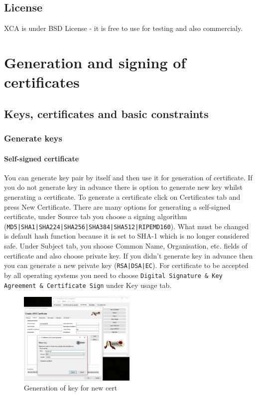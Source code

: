 \documentclass[10pt, a4paper]{report}
\begin{document}
  \subsection{License}
XCA is under BSD License - it is free to use for testing and also commercialy.
  
\section{Generation and signing of certificates}

  \subsection{Keys, certificates and basic constraints}
  
    \subsubsection{Generate keys}
    
      \paragraph{Self-signed certificate}
You can generate key pair by itself and then use it for generation of certificate. If you do not generate key in advance there is option to generate new key whilst generating a certificate. To generate a certificate click on Certificates tab and press New Certificate. There are many options for generating a self-signed certificate, under Source tab you choose a signing algorithm (\verb+MD5|SHA1|SHA224|SHA256|SHA384|SHA512|RIPEMD160+). What must be changed is default hash function because it is set to SHA-1 which is no longer considered safe. Under Subject tab, you shoose Common Name, Organisation, etc. fields of certificate and also choose private key. If you didn't generate key in advance then you can generate a new private key (\verb+RSA|DSA|EC+). For certificate to be accepted by all operating systems you need to choose \verb+Digital Signature & Key Agreement & Certificate Sign+ under Key usage tab.
\begin{figure}[!ht]
 \caption{Generation of key for new cert}
 \centering
  \includegraphics[width=0.5\textwidth]{../Dependancies/XCA/genKey.jpg}
\end{figure}
\end{document}
